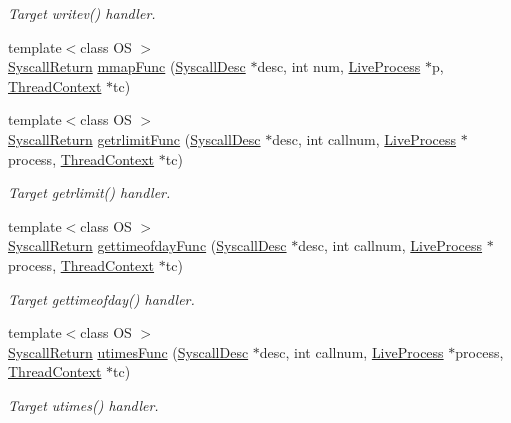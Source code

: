 \begin{DoxyCompactItemize}
\begin{DoxyCompactList}\small\item\em Target writev() handler. \item\end{DoxyCompactList}\item 
{\footnotesize template$<$class OS $>$ }\\\hyperlink{classSyscallReturn}{SyscallReturn} \hyperlink{syscall__emul_8hh_ab55f07f32ed5eff0cbfb28d3da9d05c4}{mmapFunc} (\hyperlink{classSyscallDesc}{SyscallDesc} $\ast$desc, int num, \hyperlink{classLiveProcess}{LiveProcess} $\ast$p, \hyperlink{classThreadContext}{ThreadContext} $\ast$tc)
\item 
{\footnotesize template$<$class OS $>$ }\\\hyperlink{classSyscallReturn}{SyscallReturn} \hyperlink{syscall__emul_8hh_abda22e6d45080ba7498136f15e046d61}{getrlimitFunc} (\hyperlink{classSyscallDesc}{SyscallDesc} $\ast$desc, int callnum, \hyperlink{classLiveProcess}{LiveProcess} $\ast$process, \hyperlink{classThreadContext}{ThreadContext} $\ast$tc)
\begin{DoxyCompactList}\small\item\em Target getrlimit() handler. \item\end{DoxyCompactList}\item 
{\footnotesize template$<$class OS $>$ }\\\hyperlink{classSyscallReturn}{SyscallReturn} \hyperlink{syscall__emul_8hh_aa8d95336bb3f10b1d9416b32fea82c9d}{gettimeofdayFunc} (\hyperlink{classSyscallDesc}{SyscallDesc} $\ast$desc, int callnum, \hyperlink{classLiveProcess}{LiveProcess} $\ast$process, \hyperlink{classThreadContext}{ThreadContext} $\ast$tc)
\begin{DoxyCompactList}\small\item\em Target gettimeofday() handler. \item\end{DoxyCompactList}\item 
{\footnotesize template$<$class OS $>$ }\\\hyperlink{classSyscallReturn}{SyscallReturn} \hyperlink{syscall__emul_8hh_a14cb480609d141a40fb4b6ad36c7dbed}{utimesFunc} (\hyperlink{classSyscallDesc}{SyscallDesc} $\ast$desc, int callnum, \hyperlink{classLiveProcess}{LiveProcess} $\ast$process, \hyperlink{classThreadContext}{ThreadContext} $\ast$tc)
\begin{DoxyCompactList}\small\item\em Target utimes() handler. \item\end{DoxyCompactList}\item 

\end{DoxyCompactItemize}
